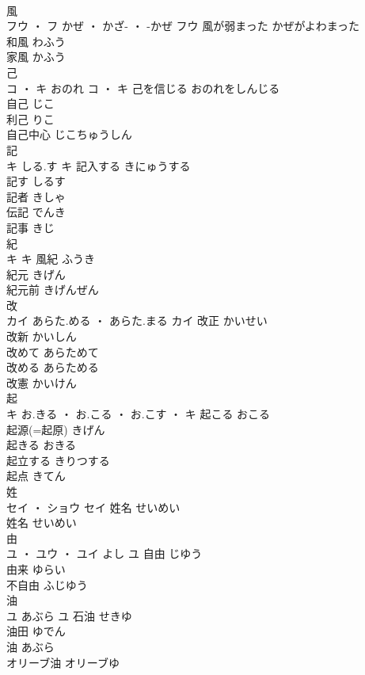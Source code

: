 \documentclass[8pt]{extreport}
\begin{document}
\begin{CJK}{UTF8}{min}
\\	風	
\\	フウ ・ フ	かぜ ・ かざ- ・ -かぜ	フウ	風が弱まった	かぜがよわまった	
\\	和風	わふう	
\\	家風	かふう	
\\	己	
\\	コ ・ キ	おのれ	コ ・ キ	己を信じる	おのれをしんじる	
\\	自己	じこ	
\\	利己	りこ	
\\	自己中心	じこちゅうしん	
\\	記	
\\	キ	しる.す	キ	記入する	きにゅうする	
\\	記す	しるす	
\\	記者	きしゃ	
\\	伝記	でんき	
\\	記事	きじ	
\\	紀	
\\	キ		キ	風紀	ふうき	
\\	紀元	きげん	
\\	紀元前	きげんぜん	
\\	改	
\\	カイ	あらた.める ・ あらた.まる	カイ	改正	かいせい	
\\	改新	かいしん	
\\	改めて	あらためて	
\\	改める	あらためる	
\\	改憲	かいけん	
\\	起	
\\	キ	お.きる ・ お.こる ・ お.こす ・	キ	起こる	おこる	
\\	起源(=起原)	きげん	
\\	起きる	おきる	
\\	起立する	きりつする	
\\	起点	きてん	
\\	姓	
\\	セイ ・ ショウ		セイ	姓名	せいめい	
\\	姓名	せいめい	
\\	由	
\\	ユ ・ ユウ ・ ユイ	よし	ユ	自由	じゆう	
\\	由来	ゆらい	
\\	不自由	ふじゆう	
\\	油	
\\	ユ	あぶら	ユ	石油	せきゆ	
\\	油田	ゆでん	
\\	油	あぶら	
\\	オリーブ油	オリーブゆ	

\end{CJK}
\end{document}

